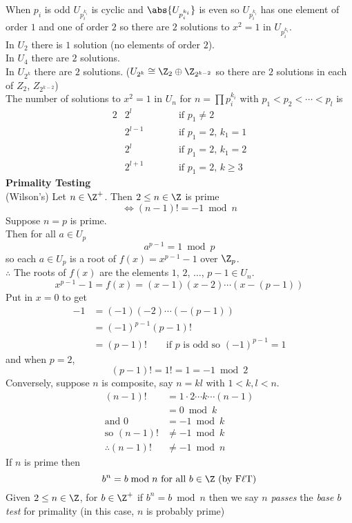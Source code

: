 When $p_i$ is odd $U_{p_i^{k_i}}$ is cyclic and $\abs{U_{p_i^{k_i}}}$ is even so $U_{p_i^{k_i}}$ has one element of order $1$ and one of order $2$ so there are $2$ solutions to $x^2=1$ in $U_{p_i^{k_i}}$. \\
In $U_2$ there is $1$ solution (no elements of order $2$). \\
In $U_4$ there are $2$ solutions. \\
In $U_{2^k}$ there are $2$ solutions. ($U_{2^k}\cong\Z_2\oplus\Z_{2^{k-2}}$ so there are $2$ solutions in each of $Z_2$, $Z_{2^{k-2}}$) \\
The number of solutions to $x^2=1$ in $U_n$ for $n=\prod p_i^{k_i}$ with $p_1<p_2<\dotsb<p_l$ is
\begin{alignat*}{2}
&2^l &\qquad&\text{if $p_1\neq2$} \\
&2^{l-1} &&\text{if $p_1=2$, $k_1=1$} \\
&2^l &&\text{if $p_1=2$, $k_1=2$} \\
&2^{l+1} &&\text{if $p_1=2$, $k\geq3$}
\end{alignat*}
\textbf{Primality Testing} \\
\thm (Wilson's) Let $n\in\Z^+$.  Then $2\leq n\in\Z$ is prime
\[ \iff (n-1)! = -1 \bmod n \]
\pf Suppose $n=p$ is prime. \\
Then for all $a\in U_p$
\[ a^{p-1} = 1 \bmod p \]
so each $a\in U_p$ is a root of $f(x)=x^{p-1}-1$ over $\Z_p$. \\
$\therefore$ The roots of $f(x)$ are the elements $1$, $2$, $\dotsc$, $p-1\in U_n$.
\[ x^{p-1}-1 = f(x) = (x-1)(x-2)\dotsm(x-(p-1)) \]
Put in $x=0$ to get
\begin{align*}
-1 &= (-1)(-2)\dotsm(-(p-1)) \\
&= (-1)^{p-1}(p-1)! \\
&= (p-1)! \qquad\text{if $p$ is odd so $(-1)^{p-1}=1$}
\end{align*}
and when $p=2$,
\[ (p-1)! = 1! = 1 = -1 \bmod 2 \]
Conversely, suppose $n$ is composite, say $n=kl$ with $1<k,l<n$.
\begin{align*}
(n-1)! &= 1 \cdot 2 \dotsm k \dotsm (n-1) \\
&= 0 \bmod k \\
\text{and } 0 &= -1 \bmod k \\
\text{so } (n-1)! &\neq -1 \bmod k \\
\therefore (n-1)! &\neq -1 \bmod n
\end{align*}
 If $n$ is prime then
\[ b^n = b \bmod n \text{ for all $b\in\Z$ (by F$\ell$T)} \]
Given $2\leq n\in\Z$, for $b\in\Z^+$ if $b^n=b\bmod n$ then we say $n$ \emph{passes} the \emph{base\/ $b$ test} for primality (in this case, $n$ is probably prime) \\
